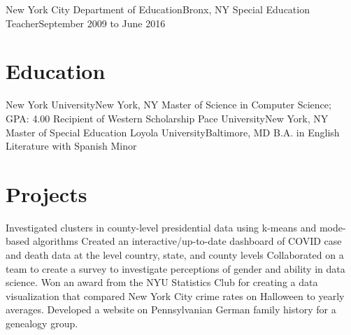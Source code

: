\documentclass[letterpaper,11pt]{article}
\begin{document}
	\resumeSubheading
	{New York City Department of Education}{Bronx, NY}
	{Special Education Teacher}{September 2009 to June 2016}
		\resumeItemListStart
		\resumeItemListEnd
	\resumeSubHeadingListEnd

\section{Education}
	\resumeSubHeadingListStart
   		\resumeSubheadingAward
      		{New York University}{New York, NY}
      		{Master of Science in Computer Science;  GPA: 4.00}{}
      		{Recipient of Western Scholarship}{}
      	\resumeSubheading
      		{Pace University}{New York, NY}
      		{Master of Special Education} {}
      	\resumeSubheading
      		{Loyola University}{Baltimore, MD}
      		{B.A. in English Literature with Spanish Minor}{}
    \resumeSubHeadingListEnd

\section{Projects}
\resumeItemListStart
				 {Investigated clusters in county-level presidential data using k-means and mode-based algorithms}
				 {Created an interactive/up-to-date dashboard of COVID case and death data at the level country,  state,  and county levels}
				{Collaborated on a team to create a survey to investigate perceptions of gender and ability in data science.}
				 {Won an award from the NYU Statistics Club for creating a data visualization that compared New York City crime rates on Halloween to yearly averages.}
				{Developed a website on Pennsylvanian German family history for a genealogy group.}
\resumeItemListEnd



\end{document}
